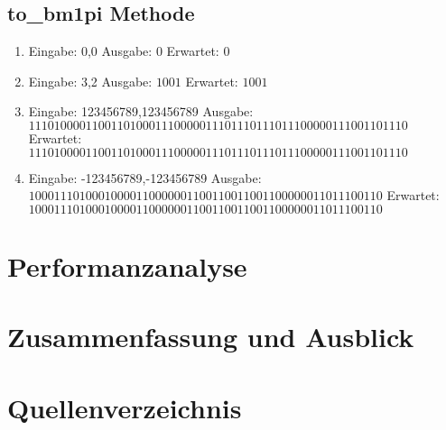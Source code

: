 \documentclass[course=erap]{aspdoc}
\begin{document}
    \subsection{to\_bm1pi Methode}
    \begin{enumerate}[label=\roman*)]
        \item Eingabe: 0,0 \quad  Ausgabe: $0$ \quad Erwartet: $0$
        \item Eingabe: 3,2 \quad Ausgabe: $1001$ \quad Erwartet: $1001$
        \item Eingabe: 123456789,123456789 \newline Ausgabe: $111010000110011010001110000011101110111011100000111001101110
        $ \newline Erwartet: $111010000110011010001110000011101110111011100000111001101110
        $
        \item Eingabe: -123456789,-123456789 \newline Ausgabe: $10001110100010000110000001100110011001100000011011100110
        $ \newline Erwartet:
        $10001110100010000110000001100110011001100000011011100110
        $
    \end{enumerate}
    \section{Performanzanalyse}

    \section{Zusammenfassung und Ausblick}

    \section{Quellenverzeichnis}

    
    {}
\end{document}
